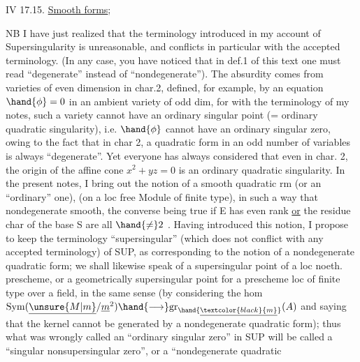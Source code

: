  

IV 17.15. \uline{Smooth forms};  

NB I have just realized \hand{\textsuperscript{\unsure{$\dagger$}}}that the terminology introduced in
my account  of Supersingularity is unreasonable, and conflicts
in particular with the accepted terminology. (In any case, you  have
noticed that in def.1 of this text one must read ``degenerate'' instead of
``nondegenerate''). The absurdity comes from varieties of even dimension
in char.2,  defined, for example, by an equation $\hand{\phi}=0$
in an ambient variety of odd dim, for with the terminology of my
notes, such a variety cannot have an  ordinary
singular point (= ordinary quadratic singularity), i.e. $\hand{\phi}$ cannot have
an ordinary singular zero, owing to the fact that in char 2, a quadratic form
in an odd number of variables is always ``degenerate''. Yet everyone
has always considered that even in char. 2, the origin of the affine cone
$x^2 + yz = 0$ is an ordinary quadratic singularity. In the present
notes, I bring out the notion of a smooth quadratic rm (or an ``ordinary'' one),
(on a loc free Module of finite type), in such a way that
nondegenerate \hand{$\Longrightarrow$} smooth, the converse being true if E has even rank
\uline{or} the residue char of the base S are all $\hand{\neq} 2$ . Having
introduced this notion, I propose to keep the terminology ``supersingular'' (which does not
conflict with any accepted terminology)  of SUP,
as corresponding to the notion of a nondegenerate quadratic form; we
shall likewise speak of a supersingular point of a loc noeth. prescheme, or a
geometrically supersingular point for a prescheme loc of finite type over a
field, in the same sense (by considering the hom $\mathrm{Sym}(\underline{\unsure{M|m}}/\underline{m}^2) \hand{\longrightarrow} \mathrm{gr}_{\hand{\underline{\textcolor{black}{m}}}}(A)$ and
 saying that the kernel cannot be generated by a nondegenerate quadratic
form); thus what was wrongly called an ``ordinary singular
zero'' in SUP will be called a ``singular nonsupersingular zero'', or a ``nondegenerate quadratic

